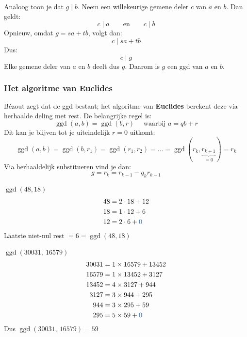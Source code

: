 Analoog toon je dat $g \mid b$. Neem een willekeurige gemene deler $c$ van $a$ en $b$. Dan geldt:
\begin{equation*}
    c \mid a \qquad \text{en} \qquad c \mid b
\end{equation*}
Opnieuw, omdat $g=sa+tb$, volgt dan:
\begin{equation*}
    c \mid sa + tb
\end{equation*}
Dus:
\begin{equation*}
    c \mid g
\end{equation*}
Elke gemene deler van $a$ en $b$ deelt dus $g$. Daarom is $g$ een ggd van $a$ en $b$.

\subsubsection{Het algoritme van Euclides}

Bézout zegt dat de ggd bestaat; het algoritme van \textbf{Euclides} berekent deze via herhaalde deling met rest. De belangrijke regel is:
\begin{equation*}
    \operatorname{ggd}(a,b) = \operatorname{ggd}(b,r) \quad \text{ waarbij } a = qb+r
\end{equation*}
Dit kan je blijven tot je uiteindelijk $r=0$ uitkomt:
\begin{equation*}
    \operatorname{ggd}(a,b) = \operatorname{ggd}(b,r_1) = \operatorname{ggd}(r_1,r_2) = \dots = \operatorname{ggd}(r_k, \underbrace{r_{k+1}}_{=0}) = r_k
\end{equation*}
Via herhaaldelijk substitueren vind je dan:
\begin{equation*}
    g = r_k = r_{k-1} - q_kr_{k-1}
\end{equation*}

\textbf{} $\operatorname{ggd}(48,18)$
\begin{equation*}
    \begin{aligned}
        48 &= 2 \cdot 18 + 12 \\
        18 &= 1 \cdot 12 + 6 \\
        12 &= 2 \cdot 6 + \textcolor{NavyBlue}{0}
    \end{aligned}
\end{equation*}
Laatste niet-nul rest $= 6 = \operatorname{ggd}(48,18)$

\textbf{} $\operatorname{ggd}(30031,\ 16579)$
\begin{equation*}
    \begin{aligned}
        30031 &= 1 \times 16579 + 13452 \\
        16579 &= 1 \times 13452 + 3127 \\
        13452 &= 4 \times 3127 + 944 \\
        3127  &= 3 \times 944 + 295 \\
        944   &= 3 \times 295 + 59 \\
        295   &= 5 \times 59 + \textcolor{NavyBlue}{0}
    \end{aligned}
\end{equation*}
Dus $\operatorname{ggd}(30031,\ 16579) = 59$

